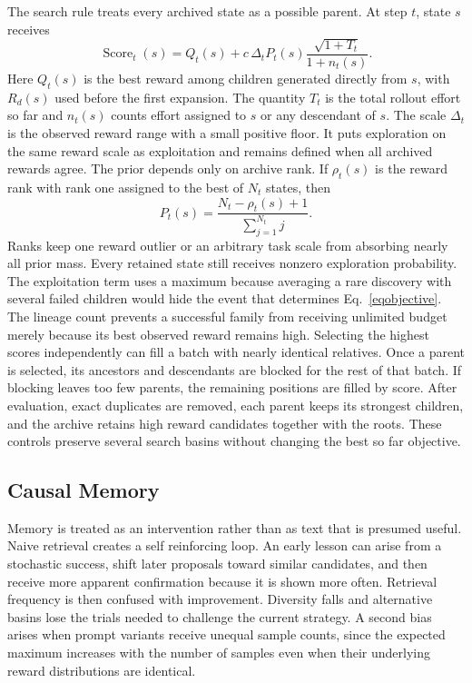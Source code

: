 \documentclass{article}
\begin{document}
The search rule treats every archived state as a possible parent. At step $t$, state $s$ receives
\begin{equation}
\operatorname{Score}_t(s)
=
Q_t(s)
+c\,\Delta_t P_t(s)
\frac{\sqrt{1+T_t}}{1+n_t(s)}.
\label{eqpuct}
\end{equation}
Here $Q_t(s)$ is the best reward among children generated directly from $s$, with $R_d(s)$ used before the first expansion. The quantity $T_t$ is the total rollout effort so far and $n_t(s)$ counts effort assigned to $s$ or any descendant of $s$. The scale $\Delta_t$ is the observed reward range with a small positive floor. It puts exploration on the same reward scale as exploitation and remains defined when all archived rewards agree.
The prior depends only on archive rank. If $\rho_t(s)$ is the reward rank with rank one assigned to the best of $N_t$ states, then
\begin{equation}
P_t(s)
=
\frac{N_t-\rho_t(s)+1}{\sum_{j=1}^{N_t}j}.
\label{eqrankprior}
\end{equation}
Ranks keep one reward outlier or an arbitrary task scale from absorbing nearly all prior mass. Every retained state still receives nonzero exploration probability. The exploitation term uses a maximum because averaging a rare discovery with several failed children would hide the event that determines Eq.~\eqref{eqobjective}. The lineage count prevents a successful family from receiving unlimited budget merely because its best observed reward remains high.
Selecting the highest scores independently can fill a batch with nearly identical relatives. Once a parent is selected, its ancestors and descendants are blocked for the rest of that batch. If blocking leaves too few parents, the remaining positions are filled by score. After evaluation, exact duplicates are removed, each parent keeps its strongest children, and the archive retains high reward candidates together with the roots. These controls preserve several search basins without changing the best so far objective.

\subsection{Causal Memory}
\label{secmemory}

Memory is treated as an intervention rather than as text that is presumed useful. Naive retrieval creates a self reinforcing loop. An early lesson can arise from a stochastic success, shift later proposals toward similar candidates, and then receive more apparent confirmation because it is shown more often. Retrieval frequency is then confused with improvement. Diversity falls and alternative basins lose the trials needed to challenge the current strategy. A second bias arises when prompt variants receive unequal sample counts, since the expected maximum increases with the number of samples even when their underlying reward distributions are identical.
\end{document}
